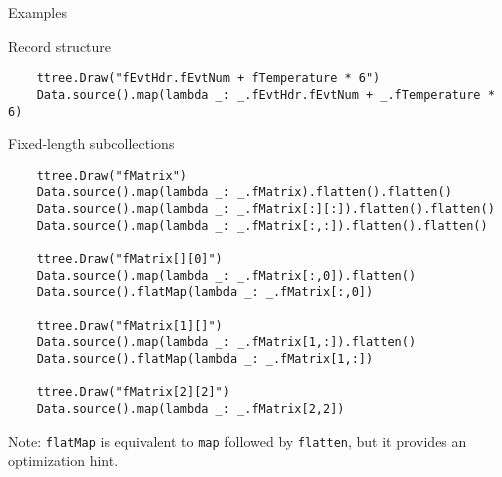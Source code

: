 \documentclass{beamer}
\begin{document}
\begin{frame}[fragile]{Examples}
\begin{block}{Record structure}
\vspace{-0.5\baselineskip}
{\scriptsize \begin{verbatim}
    ttree.Draw("fEvtHdr.fEvtNum + fTemperature * 6")
    Data.source().map(lambda _: _.fEvtHdr.fEvtNum + _.fTemperature * 6)
\end{verbatim}}
\vspace{-0.5\baselineskip}
\end{block}

\begin{block}{Fixed-length subcollections}
\vspace{-0.5\baselineskip}
{\scriptsize \begin{verbatim}
    ttree.Draw("fMatrix")
    Data.source().map(lambda _: _.fMatrix).flatten().flatten()
    Data.source().map(lambda _: _.fMatrix[:][:]).flatten().flatten()
    Data.source().map(lambda _: _.fMatrix[:,:]).flatten().flatten()

    ttree.Draw("fMatrix[][0]")
    Data.source().map(lambda _: _.fMatrix[:,0]).flatten()
    Data.source().flatMap(lambda _: _.fMatrix[:,0])

    ttree.Draw("fMatrix[1][]")
    Data.source().map(lambda _: _.fMatrix[1,:]).flatten()
    Data.source().flatMap(lambda _: _.fMatrix[1,:])

    ttree.Draw("fMatrix[2][2]")
    Data.source().map(lambda _: _.fMatrix[2,2])
\end{verbatim}}
\vspace{-0.5\baselineskip}
Note: {\tt flatMap} is equivalent to {\tt map} followed by {\tt flatten}, but it provides an optimization hint.
\end{block}
\end{frame}
\end{document}

